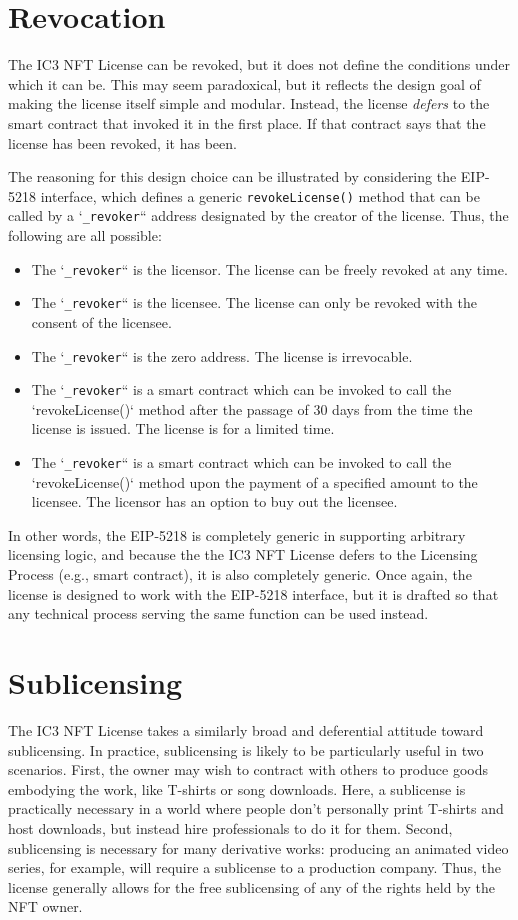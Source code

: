 \documentclass{article}
\newcommand{\eiplicense}{EIP-5218\xspace}
\newcommand{\iccclicense}{IC3 NFT License\xspace}
\begin{document}
\section{Revocation}

The \iccclicense can be revoked, but it does not define the conditions under which it can be. This may seem paradoxical, but it reflects the design goal of making the license itself simple and modular. Instead, the license \emph{defers} to the smart contract that invoked it in the first place. If that contract says that the license has been revoked, it has been. 

The reasoning for this design choice can be illustrated by considering the \eiplicense interface, which defines a generic \texttt{revokeLicense()} method that can be called by a `\texttt{\_revoker}`` address designated by the creator of the license. Thus, the following are all possible:
\begin{itemize}
\item The `\texttt{\_revoker}`` is the licensor. The license can be freely revoked at any time.
\item The `\texttt{\_revoker}`` is the licensee. The license can only be revoked with the consent of the licensee.
\item The `\texttt{\_revoker}`` is the zero address. The license is irrevocable.
\item The `\texttt{\_revoker}`` is a smart contract which can be invoked to call the `revokeLicense()` method after the passage of 30 days from the time the license is issued. The license is for a limited time.
\item The `\texttt{\_revoker}`` is a smart contract which can be invoked to call the `revokeLicense()` method upon the payment of a specified amount to the licensee. The licensor has an option to buy out the licensee.
\end{itemize}
In other words, the \eiplicense is completely generic in supporting arbitrary licensing logic, and because the the \iccclicense defers to the Licensing Process (e.g., smart contract), it is also completely generic. Once again, the license is designed to work with the \eiplicense interface, but it is drafted so that any technical process serving the same function can be used instead.

\section{Sublicensing}

The \iccclicense takes a similarly broad and deferential attitude toward sublicensing. In practice, sublicensing is likely to be particularly useful in two scenarios. First, the owner may wish to contract with others to produce goods embodying the work, like T-shirts or song downloads. Here, a sublicense is practically necessary in a world where people don't personally print T-shirts and host downloads, but instead hire professionals to do it for them. Second, sublicensing is necessary for many derivative works: producing an animated video series, for example, will require a sublicense to a production company. Thus, the license generally allows for the free sublicensing of any of the rights held by the NFT owner.
\end{document}
